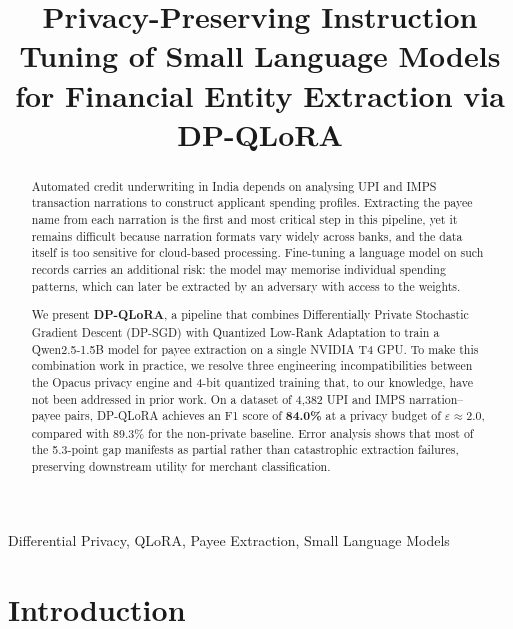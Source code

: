 \documentclass[conference]{IEEEtran}
\begin{document}
\title{Privacy-Preserving Instruction Tuning of Small
Language Models for Financial Entity Extraction
via DP-QLoRA}

\author{
 
}

\maketitle

\begin{abstract}
Automated credit underwriting in India depends on analysing UPI and IMPS transaction narrations to construct applicant spending profiles. Extracting the payee name from each narration is the first and most critical step in this pipeline, yet it remains difficult because narration formats vary widely across banks, and the data itself is too sensitive for cloud-based processing. Fine-tuning a language model on such records carries an additional risk: the model may memorise individual spending patterns, which can later be extracted by an adversary with access to the weights.

We present \textbf{DP-QLoRA}, a pipeline that combines Differentially Private Stochastic Gradient Descent (DP-SGD) with Quantized Low-Rank Adaptation to train a Qwen2.5-1.5B model for payee extraction on a single NVIDIA T4 GPU. To make this combination work in practice, we resolve three engineering incompatibilities between the Opacus privacy engine and 4-bit quantized training that, to our knowledge, have not been addressed in prior work. On a dataset of 4{,}382 UPI and IMPS narration--payee pairs, DP-QLoRA achieves an F1 score of \textbf{84.0\%} at a privacy budget of $\varepsilon \approx 2.0$, compared with 89.3\% for the non-private baseline. Error analysis shows that most of the 5.3-point gap manifests as partial rather than catastrophic extraction failures, preserving downstream utility for merchant classification.
\end{abstract}

\begin{IEEEkeywords}
Differential Privacy, QLoRA, Payee Extraction, Small Language Models
\end{IEEEkeywords}

\section{Introduction}
\label{sec:intro}
\end{document}
